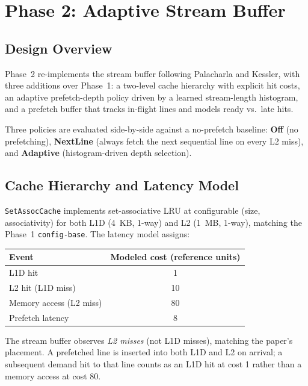 \documentclass[11pt,letterpaper]{article}
\begin{document}
\section{Phase 2: Adaptive Stream Buffer}

\subsection{Design Overview}

Phase~2 re-implements the stream buffer following Palacharla and Kessler,
with three additions over Phase~1: a two-level cache hierarchy with explicit
hit costs, an adaptive prefetch-depth policy driven by a learned stream-length
histogram, and a prefetch buffer that tracks in-flight lines and models ready
vs.\ late hits.

Three policies are evaluated side-by-side against a no-prefetch baseline:
\textbf{Off} (no prefetching), \textbf{NextLine} (always fetch the next
sequential line on every L2 miss), and \textbf{Adaptive} (histogram-driven
depth selection).

\subsection{Cache Hierarchy and Latency Model}

\texttt{SetAssocCache} implements set-associative LRU at configurable
(size, associativity) for both L1D (4~KB, 1-way) and L2 (1~MB, 1-way),
matching the Phase~1 \texttt{config-base}. The latency model assigns:

\begin{center}
\begin{tabular}{lc}
\toprule
Event & Modeled cost (reference units) \\
\midrule
L1D hit & 1 \\
L2 hit (L1D miss) & 10 \\
Memory access (L2 miss) & 80 \\
Prefetch latency & 8 \\
\bottomrule
\end{tabular}
\end{center}

The stream buffer observes \emph{L2 misses} (not L1D misses), matching the
paper's placement. A prefetched line is inserted into both L1D and L2 on
arrival; a subsequent demand hit to that line counts as an L1D hit at cost 1
rather than a memory access at cost 80.
\end{document}
